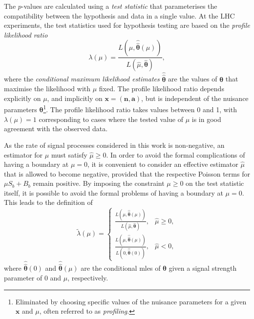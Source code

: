 The $p$-values are calculated using a \textit{test statistic} that parameterises the compatibility between the hypothesis and data in a single value. At the LHC experiments, the test statistics used for hypothesis testing are based on the \textit{profile likelihood ratio}
\begin{equation}
	\lambda(\mu) = \frac{L(\mu,\boldsymbol{\hat{\hat{\theta}}}(\mu))}{L(\hat{\mu},\hat{\boldsymbol{\theta}})},
\end{equation}
where the \textit{conditional maximum likelihood estimates} $\boldsymbol{\hat{\hat{\theta}}}$ are the values of $\boldsymbol{\theta}$ that maximise the likelihood with $\mu$ fixed. The profile likelihood ratio depends explicitly on $\mu$, and implicitly on $\boldsymbol{x} = (\boldsymbol{n},\boldsymbol{a})$, but is independent of the nuisance parameters $\boldsymbol{\theta}$\footnote{Eliminated by choosing specific values of the nuisance parameters for a given $\boldsymbol{x}$ and $\mu$, often referred to as \textit{profiling}.}. The profile likelihood ratio takes values between 0 and 1, with $\lambda(\mu) = 1$ corresponding to cases where the tested value of $\mu$ is in good agreement with the observed data.

As the rate of signal processes considered in this work is non-negative, an estimator for $\mu$ must satisfy $\hat{\mu}\geq 0$. In order to avoid the formal complications of having a boundary at $\mu = 0$, it is convenient to consider an effective estimator $\hat{\mu}$ that is allowed to become negative, provided that the respective Poisson terms for $\mu S_b + B_b$ remain positive. By imposing the constraint $\mu \geq 0$ on the test statistic itself, it is possible to avoid the formal problems of having a boundary at $\mu = 0$. This leads to the definition of
\begin{equation}
	\tilde{\lambda}(\mu)= 
\begin{cases}
     \frac{L(\mu,\boldsymbol{\hat{\hat{\theta}}}(\mu))}{L(\hat{\mu},\hat{\boldsymbol{\theta}})}, & \hat{\mu} \geq 0,\\
     \frac{L(\mu,\boldsymbol{\hat{\hat{\theta}}}(\mu))}{L(0,\boldsymbol{\hat{\hat{\theta}}}(0))},              & \hat{\mu} < 0,
\end{cases}
\label{eq:lambda_tilde}
\end{equation}
where $\boldsymbol{\hat{\hat{\theta}}}(0)$ and $\boldsymbol{\hat{\hat{\theta}}}(\mu)$ are the conditional \glspl{mle} of $\boldsymbol{\theta}$ given a signal strength parameter of 0 and $\mu$, respectively. 

